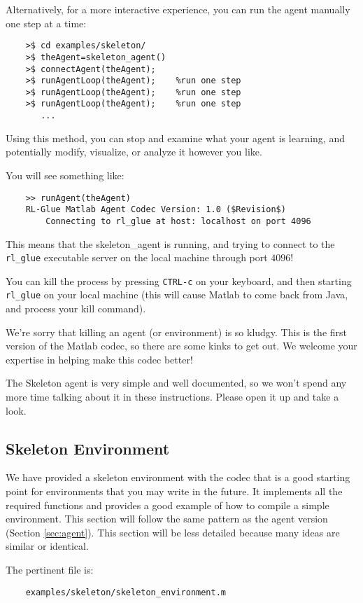 \documentclass[11pt]{article}
\begin{document}
Alternatively, for a more interactive experience, you can run the agent manually one step at a time:
\begin{verbatim}
	>$ cd examples/skeleton/
	>$ theAgent=skeleton_agent()
	>$ connectAgent(theAgent);
	>$ runAgentLoop(theAgent);    %run one step
	>$ runAgentLoop(theAgent);    %run one step
	>$ runAgentLoop(theAgent);    %run one step
	   ...
\end{verbatim}

Using this method, you can stop and examine what your agent is learning, and potentially modify, visualize, or analyze it however you like.

You will see something like:
\begin{verbatim}
	>> runAgent(theAgent)
	RL-Glue Matlab Agent Codec Version: 1.0 ($Revision$)
	    Connecting to rl_glue at host: localhost on port 4096
\end{verbatim}

This means that the skeleton\_agent is running, and trying to connect to the \texttt{rl\_glue} executable server on the local machine through port $4096$! 

You can kill the process by pressing \texttt{CTRL-c} on your keyboard, and then starting  \texttt{rl\_glue} on your local machine (this will cause Matlab to come back from Java, and process your kill command).

We're sorry that killing an agent (or environment) is so kludgy.  This is the first version of the Matlab codec, so there are some kinks to get out.  We welcome your expertise in helping 
make this codec better!

The Skeleton agent is very simple and well documented, so we won't spend any more time talking about it in these instructions.
Please open it up and take a look.

\subsection{Skeleton Environment}
\label{sec:env}

We have provided a skeleton environment with the codec that is a good starting point for environments that you may write in the future.
It implements all the required functions and provides a good example of how to compile a simple environment.  This section will follow the same 
pattern as the agent version (Section \ref{sec:agent}).  This section will be less detailed because many ideas are similar or identical.


The pertinent file is:
\begin{verbatim}
	examples/skeleton/skeleton_environment.m
\end{verbatim}
\end{document}
